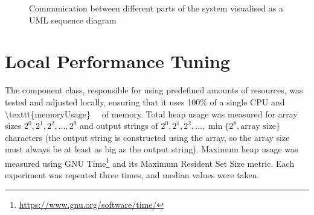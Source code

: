 \documentclass{article}
\begin{document}
\begin{figure}
  \centering
  \caption{Communication between different parts of the system visualised as a
    UML sequence diagram}
  \label{fig:communication}
\end{figure}

\section{Local Performance Tuning} \label{sec:adjustments}

The component class, responsible for using predefined amounts of resources, was
tested and adjusted locally, ensuring that it uses 100\% of a single CPU and
\SI[number-math-rm = \mathnormal, parse-numbers =
false]{\texttt{memoryUsage}}{\mebi\byte} of memory. Total heap usage was
measured for array sizes $2^0, 2^1, 2^2, \dots, 2^9$ and output strings of $2^0,
2^1, 2^2, \dots, \min \{ 2^8, \text{array size} \}$ characters (the output
string is constructed using the array, so the array size must always be at least
as big as the output string). Maximum heap usage was measured using GNU
Time\footnote{\url{https://www.gnu.org/software/time/}} and its Maximum Resident
Set Size metric. Each experiment was repeated three times, and median values
were taken.
\end{document}
